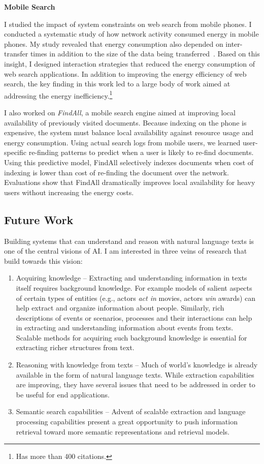 \documentclass[a4paper,11pt,onecolumn]{article}
\begin{document}
{\bf Mobile Search}

I studied the impact of system constraints on web search from mobile phones. I conducted a systematic study of how network activity consumed energy in mobile phones. My study revealed that energy consumption also depended on inter-transfer times in addition to the size of the data being transferred~\cite{balasubramanian-imc09}. Based on this insight, I designed interaction strategies that reduced the energy consumption of web search applications. In addition to improving the energy efficiency of web search, the key finding in this work led to a large body of work aimed at addressing the energy inefficiency.\footnote{Has more than 400 citations.}

I also worked on {\em FindAll}, a mobile search engine aimed at improving local availability of previously visited documents. Because indexing on the phone is expensive, the system must balance local availability against resource usage and energy consumption. Using actual search logs from mobile users, we learned user-specific re-finding patterns to predict when a user is likely to re-find documents. Using this predictive model, FindAll selectively indexes documents when cost of indexing is lower than cost of re-finding the document over the network. Evaluations show that FindAll dramatically improves local availability for heavy users without increasing the energy costs.

\subsection*{Future Work}

Building systems that can understand and reason with natural language texts is one of the central visions of AI. 	 
I am interested in three veins of research that build towards this vision: 
\begin{enumerate}
\item Acquiring knowledge -- Extracting and understanding information in texts itself requires background knowledge. For example models of salient aspects of certain types of entities (e.g., actors {\em act in} movies, actors {\em win} awards) can help extract and organize information about people. Similarly, rich descriptions of events or scenarios, processes and their interactions can help in extracting and understanding information about events from texts. Scalable methods for acquiring such background knowledge is essential for extracting richer structures from text.  
\item Reasoning with knowledge from texts -- Much of world's knowledge is already available in the form of natural language texts. While extraction capabilities are improving, they have several issues that need to be addressed in order to be useful for end applications. 
\item Semantic search capabilities -- Advent of scalable extraction and language processing capabilities present a great opportunity to push information retrieval toward more semantic representations and retrieval models.
\end{enumerate}
\end{document}
